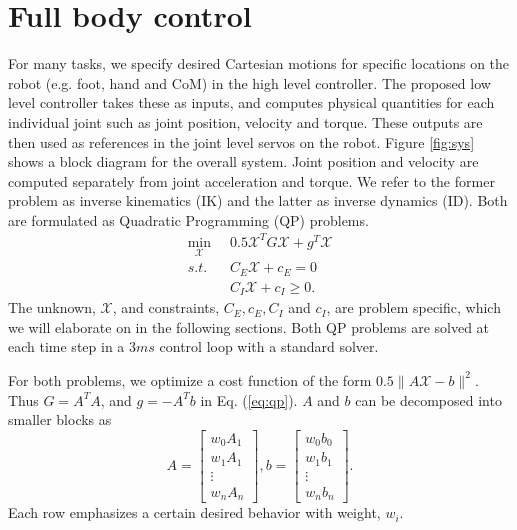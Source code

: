 \documentclass{ws-ijhr}
\newcommand{\eref}[1] {Eq. (\ref{#1})}
\newcommand{\fref}[1] {Figure \ref{#1}}
\newcommand{\QPx}{\mathcal{X}}
\begin{document}
\section{Full body control}
For many tasks, we specify desired Cartesian motions for specific locations on 
the robot (e.g. foot, hand and CoM) in the high level controller. 
The proposed low level controller takes these as inputs, and computes physical 
quantities for each individual joint such as joint position, velocity and torque. 
These outputs are then used as references in the joint
level servos on the robot. \fref{fig:sys} shows a block diagram for the overall 
system. Joint position and velocity are computed separately 
from joint acceleration and torque. We refer to the former problem as inverse 
kinematics (IK) and the latter as inverse dynamics (ID). Both are formulated as 
Quadratic Programming (QP) problems. 
\begin{equation}
  \begin{split}
  \min_{\QPx}\;\; & 0.5\QPx^TG\QPx + g^T\QPx \\
  s.t.\;\; & C_E\QPx + c_E = 0 \\
  & C_I\QPx + c_I \geq 0.
  \end{split}
	\label{eq:qp}
\end{equation} 
The unknown, ${\QPx}$, and constraints, $C_E, c_E, C_I$ and $c_I$, are problem specific,
which we will elaborate on in the following sections. Both QP problems are solved at 
each time step in a 3$ms$ control loop with a standard solver. 

For both problems, we optimize a cost function of the form $0.5\|A\QPx-b\|^2$. 
Thus $G = A^TA$, and $g = -A^Tb$ in \eref{eq:qp}.
$A$ and $b$ can be decomposed into smaller blocks as 
\begin{equation}
  A = \begin{bmatrix} w_0A_1 \\ w_1 A_1 \\ \vdots \\ w_nA_n \end{bmatrix},
  b = \begin{bmatrix} w_0b_0 \\ w_1 b_1 \\ \vdots \\ w_nb_n \end{bmatrix}.
  \label{eq:cost}
\end{equation}
Each row emphasizes a certain desired behavior with weight, $w_i$.
\end{document}
